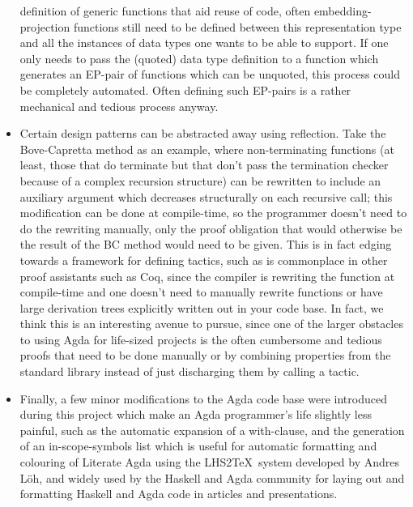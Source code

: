 \begin{itemize}
definition of generic functions that aid reuse of code, often
embedding-projection functions still need to be defined between this
representation type and all the instances of data types one wants to be
able to support. If one only needs to pass the
(quoted) data type definition to a function which generates an EP-pair
of functions which can be unquoted, this process could be completely
automated. Often defining such EP-pairs is a rather mechanical and
tedious process anyway.
  \item Certain design patterns can be abstracted away using
reflection. Take the Bove-Capretta method as an example, where
non-terminating functions (at least, those that do terminate but that
don't pass the termination checker because of a complex recursion
structure) can be rewritten to include an auxiliary argument which
decreases structurally on each recursive call; this modification can be done at compile-time, so the programmer doesn't
need to do the rewriting manually, only the proof obligation that
would otherwise be
the result of the BC method would need to be given.  This is in fact
edging towards a framework for defining tactics, such as is
commonplace in other proof assistants such as Coq, since the
compiler is rewriting the function at compile-time and one doesn't
need to manually rewrite functions or have large derivation trees
explicitly written out in your code base.  In fact, we think this is
an interesting avenue to pursue, since one of the larger obstacles to
using Agda for life-sized projects is the often cumbersome and tedious
proofs that need to be done manually or by combining properties from
the standard library instead of just discharging them by calling a
tactic.
  \item Finally, a few minor modifications to the Agda code base were
introduced during this project which make an Agda programmer's life
slightly less painful, such as the automatic expansion of a
with-clause, and the generation of an in-scope-symbols list which is
useful for automatic formatting and colouring of Literate Agda using
the LHS2\TeX\ system developed by Andres L\"oh, and widely used by the
Haskell and Agda community for laying out and formatting Haskell and
Agda code in articles and presentations.
\end{itemize}



